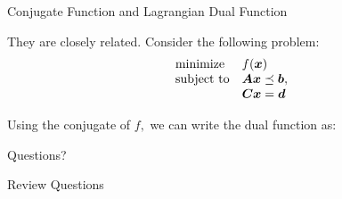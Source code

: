 \documentclass[handout,fleqn,aspectratio=169]{beamer}
\begin{document}
\begin{frame}{Conjugate Function and Lagrangian Dual Function}

\plitemsep 0.1in

\bci 

\item They are closely related. Consider the following problem:
\[
\begin{array}{ll}
\mbox{minimize} & f(\bm{x})\\
\mbox{subject to} & \bm{A} \bm{x} \preceq \bm{b}, \\
& \bm{C} \bm{x} = \bm{d}
\end{array}
\]

\item Using the conjugate of $f,$ we can write the dual function as:
\eci
\end{frame}


\begin{frame}{}
\vspace{2cm}
\LARGE Questions?


\end{frame}

\begin{frame}{Review Questions}
\bce[1)]
\item 

\ece
\end{frame}
\end{document}
